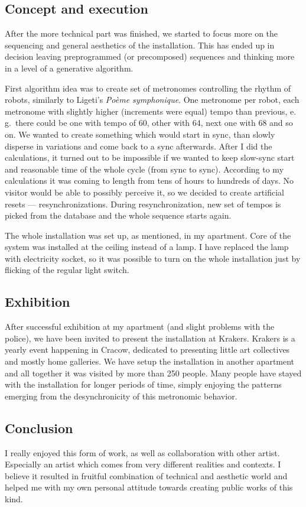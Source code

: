 \documentclass[12pt,a4paper,oneside]{report}
\begin{document}
\subsection{Concept and execution} After the more technical part was finished, we started to focus more on the sequencing and general aesthetics of the installation. This has ended up in decision leaving preprogrammed (or precomposed) sequences and thinking more in a level of a generative algorithm. 

First algorithm idea was to create set of metronomes controlling the rhythm of robots, similarly to Ligeti's \emph{Poème symphonique}. One metronome per robot, each metronome with slightly higher (increments were equal) tempo than previous, e. g.\ there could be one with tempo of 60, other with 64, next one with 68 and so on. We wanted to create something which would start in sync, than slowly disperse in variations and come back to a sync afterwards. After I did the calculations, it turned out to be impossible if we wanted to keep slow-sync start and reasonable time of the whole cycle (from sync to sync). According to my calculations it was coming to length from tens of hours to hundreds of days. No visitor would be able to possibly perceive it, so we decided to create artificial resets --- resynchronizations. During resynchronization, new set of tempos is picked from the database and the whole sequence starts again.

The whole installation was set up, as mentioned, in my apartment. Core of the system was installed at the ceiling instead of a lamp. I have replaced the lamp with electricity socket, so it was possible to turn on the whole installation just by flicking of the regular light switch.

\subsection{Exhibition} After successful exhibition at my apartment (and slight problems with the police), we have been invited to present the installation at Krakers. Krakers is a yearly event happening in Cracow, dedicated to presenting little art collectives and mostly home galleries. We have setup the installation in another apartment and all together it was visited by more than 250 people. Many people have stayed with the installation for longer periods of time, simply enjoying the patterns emerging from the desynchronicity of this metronomic behavior.

\subsection{Conclusion} I really enjoyed this form of work, as well as collaboration with other artist. Especially an artist which comes from very different realities and contexts. I believe it resulted in fruitful combination of technical and aesthetic world and helped me with my own personal attitude towards creating public works of this kind.
\end{document}
